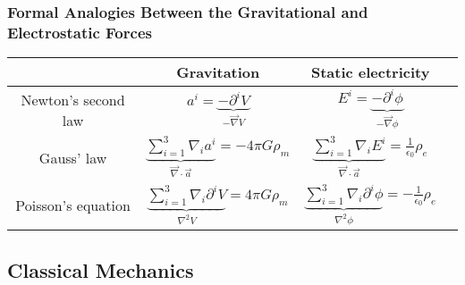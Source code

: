 \documentclass{beamer}
\begin{document}
\begin{frame}
\frametitle{Formal Analogies Between the Gravitational and Electrostatic Forces}

\begin{center}
\begin{tabular}{ |c|c|c|c| } 
\hline
& Gravitation & Static electricity \\
\hline
Newton's second law & $a^i = \underset{- \vec{\nabla} V}{\underbrace{- \partial^i V}}$ & $E^i = \underset{- \vec{\nabla} \phi}{\underbrace{- \partial^i \phi}}$ \\
\hline
Gauss' law & $\underset{\vec{\nabla} \cdot \vec{a}}{\underbrace{\sum \limits_{i=1}^3 \nabla_i a^i}} = - 4 \pi G \rho_m$ & $\underset{\vec{\nabla} \cdot \vec{a}}{\underbrace{\sum \limits_{i=1}^3 \nabla_i E^i}} = \frac{1}{\epsilon_0} \rho_e$ \\
\hline
Poisson's equation & $\underset{\nabla^2 V}{\underbrace{\sum \limits_{i=1}^3 \nabla_i \partial^i V}} = 4 \pi G \rho_m$ & $\underset{\nabla^2 \phi}{\underbrace{\sum \limits_{i=1}^3 \nabla_i \partial^i \phi}} = - \frac{1}{\epsilon_0} \rho_e$ \\  
\hline
\end{tabular}
\end{center}
\end{frame}

\subsection{Classical Mechanics}
\end{document}
